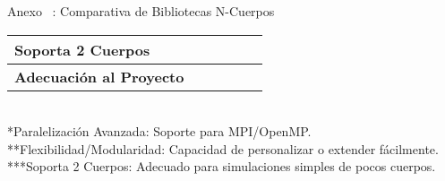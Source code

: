 \begin{frame}{Anexo \thesection~: Comparativa de Bibliotecas N-Cuerpos}
\begin{adjustbox}{max width=\textwidth, max height=0.35\textheight, keepaspectratio}
\begin{tabular}{@{}p{5cm} >{\centering\arraybackslash}p{3.5cm} >{\centering\arraybackslash}p{2.5cm} >{\centering\arraybackslash}p{2.5cm} >{\centering\arraybackslash}p{2.5cm} >{\centering\arraybackslash}p{2.5cm}@{}}
            \midrule
            Soporta 2 Cuerpos & \color{green}{\checkmark} & \color{red}{\xmark} & \color{red!40!orange}{Posible} & \color{green}{\checkmark} & \color{red}{\xmark} \\
            \midrule
            \rowcolor{yellow!30}
            \textbf{Adecuación al Proyecto} & \textbf{\color{green}{\checkmark}} & \textbf{\color{red}{\xmark}} & \textbf{\color{red}{\xmark}} & \textbf{\color{red}{\xmark}} & \textbf{\color{red}{\xmark}} \\
            \bottomrule
        \end{tabular}
    \end{adjustbox}
    \smallskip
    \vspace{0cm}\\
    \tiny{*Paralelización Avanzada: Soporte para MPI/OpenMP.}\\
    \tiny{**Flexibilidad/Modularidad: Capacidad de personalizar o extender fácilmente.}\\
    \tiny{***Soporta 2 Cuerpos: Adecuado para simulaciones simples de pocos cuerpos.}
\end{frame}

